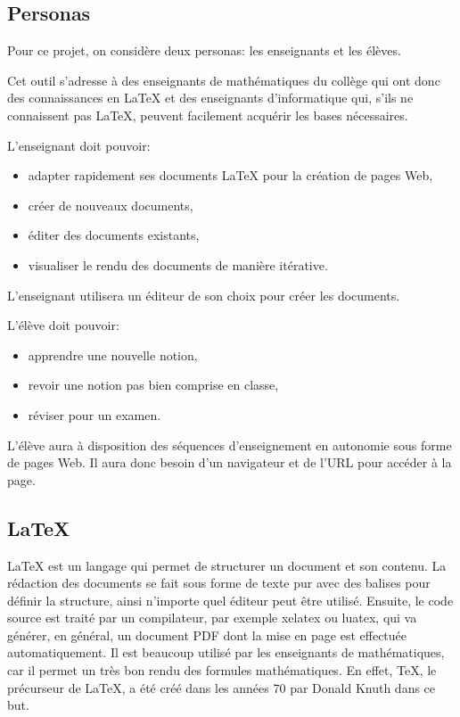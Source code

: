 \documentclass[12pt,titlepage,oneside]{article}
\begin{document}
\subsection{Personas}
Pour ce projet, on considère deux personas: les enseignants et les élèves.\par
Cet outil s'adresse à des enseignants de mathématiques du collège qui ont donc des connaissances en LaTeX et des enseignants d'informatique qui, s'ils ne connaissent pas LaTeX, peuvent facilement acquérir les bases nécessaires.\par
L'enseignant doit pouvoir:
\begin{itemize}
\item adapter rapidement ses documents LaTeX pour la création de pages Web,
\item créer de nouveaux documents,
\item éditer des documents existants,
\item visualiser le rendu des documents de manière itérative.
\end{itemize}
L'enseignant utilisera un éditeur de son choix pour créer les documents.\par
L'élève doit pouvoir:
\begin{itemize}
\item apprendre une nouvelle notion,
\item revoir une notion pas bien comprise en classe,
\item réviser pour un examen.
\end{itemize}
L'élève aura à disposition des séquences d'enseignement en autonomie sous forme de pages Web. Il aura donc besoin d'un navigateur et de l'URL pour accéder à la page.\par

\newpage

\subsection{LaTeX}
LaTeX est un langage qui permet de structurer un document et son contenu. La rédaction des documents se fait sous forme de texte pur avec des balises pour définir la structure, ainsi n'importe quel éditeur peut être utilisé. Ensuite, le code source est traité par un compilateur, par exemple xelatex ou luatex, qui va générer, en général, un document PDF dont la mise en page est effectuée automatiquement. Il est beaucoup utilisé par les enseignants de mathématiques, car il permet un très bon rendu des formules mathématiques. En effet, TeX, le précurseur de LaTeX, a été créé dans les années 70 par Donald Knuth dans ce but.\par
\end{document}
